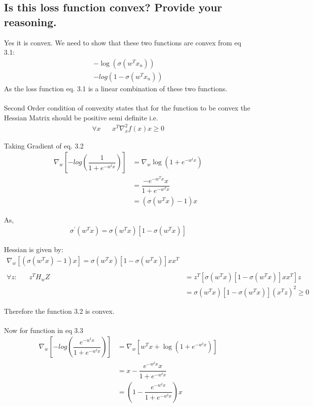 \documentclass[paper=a4, fontsize=11pt]{scrartcl} %
\numberwithin{equation}{section} %
\numberwithin{figure}{section} %
\numberwithin{table}{section} %
\begin{document}
\subsection{Is this loss function convex? Provide your reasoning.}
Yes it is convex. We need to show that these two functions are convex from eq 3.1:
\begin{align} 
- \log(\sigma(w^{T}x_{n}))\\
- log(1-\sigma(w^{T}x_{n}))
\end{align}
As the loss function eq. 3.1 is a linear combination of these two functions.\\\\
Second Order condition of convexity states that for the function to be convex the Hessian Matrix should be positive semi definite i.e.
\begin{align*} 
\forall x \hspace{20pt} x^{T}\nabla^{2}_{x}f(x) x \geqslant 0
\end{align*}

Taking Gradient of eq. 3.2
\begin{align*}
\nabla_{w}[-log(\dfrac{1}{1+e^{-w^{t}x}})] &=  \nabla_{w} \log(1+e^{-w^{t}x})\\
&= \dfrac{-e^{-w^{T}x}x}{1+e^{-w^{T}x}}\\
&= (\sigma(w^{T}x)-1)x
\end{align*}

As,
\begin{align*}
\sigma^{'}(w^{T}x) = \sigma(w^{T}x)[1-\sigma(w^{T}x)]
\end{align*}

Hessian is given by:
\begin{align*}
\nabla_{w} [(\sigma(w^{T}x)-1)x] = \sigma(w^{T}x)[1-\sigma(w^{T}x)]xx^{T}\\\\
\forall z : \hspace{20pt} z^{T}H_{w}Z &= z^{T}[\sigma(w^{T}x)[1-\sigma(w^{T}x)]xx^{T}]z\\
&= \sigma(w^{T}x)[1-\sigma(w^{T}x)](x^{T}z)^{2} \geq 0
\end{align*}

Therefore the function 3.2 is convex.\\\\
Now for function in eq 3.3
\begin{align*}
\nabla_{w} [-log(\dfrac{e^{-w^{t}x}}{1+e^{-w^{t}x}})] &= \nabla_{w} [w^{T}x +\log(1+e^{-w^{t}x})]\\
&= x - \dfrac{e^{-w^{t}x}x}{1+e^{-w^{t}x}}\\
&= (1 - \dfrac{e^{-w^{t}x}}{1+e^{-w^{t}x}})x
\end{align*}
\end{document}
